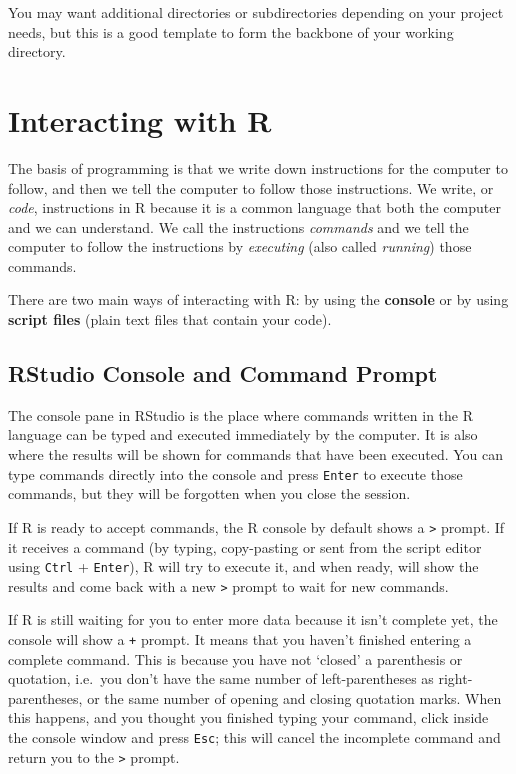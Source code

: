 \documentclass[
]{book}
\begin{document}
You may want additional directories or subdirectories depending on your project
needs, but this is a good template to form the backbone of your working directory.

\hypertarget{interacting-with-r}{%
\section{Interacting with R}\label{interacting-with-r}}

The basis of programming is that we write down instructions for the computer to
follow, and then we tell the computer to follow those instructions. We write, or
\emph{code}, instructions in R because it is a common language that both the computer
and we can understand. We call the instructions \emph{commands} and we tell the
computer to follow the instructions by \emph{executing} (also called \emph{running}) those
commands.

There are two main ways of interacting with R: by using the \textbf{console} or by using
\textbf{script files} (plain text files that contain your code).

\hypertarget{rstudio-console-and-command-prompt}{%
\subsection{RStudio Console and Command Prompt}\label{rstudio-console-and-command-prompt}}

The console pane in RStudio is the place where commands written in the R
language can be typed and executed immediately by the computer. It is also where
the results will be shown for commands that have been executed. You can type
commands directly into the console and press \texttt{Enter} to execute those commands, but they will be forgotten when you close the session.

If R is ready to accept commands, the R console by default shows a \texttt{\textgreater{}} prompt. If it
receives a command (by typing, copy-pasting or sent from the script editor using
\texttt{Ctrl} + \texttt{Enter}), R will try to execute it, and when
ready, will show the results and come back with a new \texttt{\textgreater{}} prompt to wait for new
commands.

If R is still waiting for you to enter more data because it isn't complete yet,
the console will show a \texttt{+} prompt. It means that you haven't finished entering
a complete command. This is because you have not `closed' a parenthesis or
quotation, i.e.~you don't have the same number of left-parentheses as
right-parentheses, or the same number of opening and closing quotation marks.
When this happens, and you thought you finished typing your command, click
inside the console window and press \texttt{Esc}; this will cancel the incomplete
command and return you to the \texttt{\textgreater{}} prompt.
\end{document}
